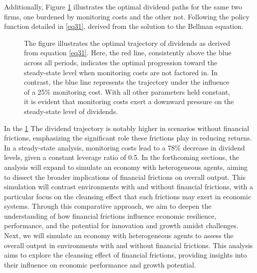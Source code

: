 \documentclass[12pt]{report}
\begin{document}
Additionally, Figure \ref{fig:dividendsEvolution} illustrates the optimal dividend paths for the same two firms, one
burdened by monitoring costs and the other not. Following the policy function detailed in \ref{eq31}, derived from
the solution to the Bellman equation.

\begin{figure}
    \centering
    \caption{The figure illustrates the optimal trajectory of dividends as derived from equation \ref{eq31}. Here, the
    red line, consistently above the blue across all periods, indicates the optimal progression toward the steady-state
    level when monitoring costs are not factored in. In contrast, the blue line represents the trajectory under the
    influence of a 25\% monitoring cost. With all other parameters held constant, it is evident that monitoring costs
    exert a downward pressure on the steady-state level of dividends.}
    \label{fig:dividendsEvolution}
\end{figure}

In the \ref{fig:dividendsEvolution} The dividend trajectory is notably higher in scenarios without financial frictions, emphasizing the significant role
these frictions play in reducing returns. In a steady-state analysis, monitoring costs lead to a 78\% decrease in
dividend levels, given a constant leverage ratio of 0.5. 
In the forthcoming sections, the analysis will expand to simulate an economy with heterogeneous agents, aiming to
dissect the broader implications of financial frictions on overall output. This simulation will contrast environments
with and without financial frictions, with a particular focus on the cleansing effect that such frictions may exert in
economic systems. Through this comparative approach, we aim to deepen the understanding of how financial frictions
influence economic resilience, performance, and the potential for innovation and growth amidst challenges. 
Next, we will simulate an economy with heterogeneous agents to assess the overall output in environments with and
without financial frictions. This analysis aims to explore the cleansing effect of financial frictions, providing
insights into their influence on economic performance and growth potential.
\end{document}
